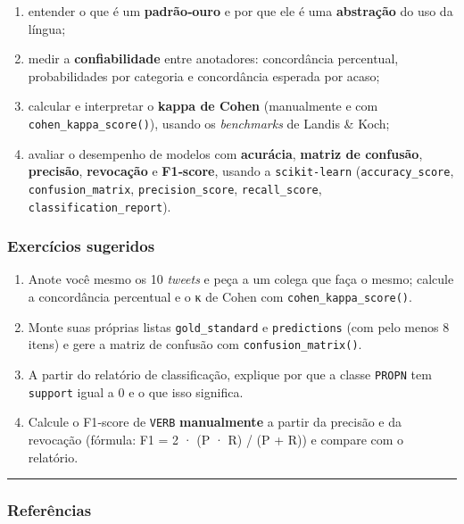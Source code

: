 \documentclass[
  brazilian,
  11pt,
]{article}
\providecommand{\tightlist}{%
  \setlength{\itemsep}{0pt}\setlength{\parskip}{0pt}}
\let\oldtexttt\texttt
\renewcommand{\texttt}[1]{{\color{inlink}\oldtexttt{#1}}}
\begin{document}
\begin{enumerate}
\def\labelenumi{\arabic{enumi}.}
\tightlist
\item
  entender o que é um \textbf{padrão‑ouro} e por que ele é uma
  \textbf{abstração} do uso da língua;
\item
  medir a \textbf{confiabilidade} entre anotadores: concordância
  percentual, probabilidades por categoria e concordância esperada por
  acaso;
\item
  calcular e interpretar o \textbf{kappa de Cohen} (manualmente e com
  \texttt{cohen\_kappa\_score()}), usando os \emph{benchmarks} de Landis
  \& Koch;
\item
  avaliar o desempenho de modelos com \textbf{acurácia}, \textbf{matriz
  de confusão}, \textbf{precisão}, \textbf{revocação} e
  \textbf{F1‑score}, usando a \texttt{scikit‑learn}
  (\texttt{accuracy\_score}, \texttt{confusion\_matrix},
  \texttt{precision\_score}, \texttt{recall\_score},
  \texttt{classification\_report}).
\end{enumerate}

\subsubsection{Exercícios sugeridos}\label{exercuxedcios-sugeridos}

\begin{enumerate}
\def\labelenumi{\arabic{enumi}.}
\tightlist
\item
  Anote você mesmo os 10 \emph{tweets} e peça a um colega que faça o
  mesmo; calcule a concordância percentual e o κ de Cohen com
  \texttt{cohen\_kappa\_score()}.
\item
  Monte suas próprias listas \texttt{gold\_standard} e
  \texttt{predictions} (com pelo menos 8 itens) e gere a matriz de
  confusão com \texttt{confusion\_matrix()}.
\item
  A partir do relatório de classificação, explique por que a classe
  \texttt{PROPN} tem \texttt{support} igual a 0 e o que isso significa.
\item
  Calcule o F1‑score de \texttt{VERB} \textbf{manualmente} a partir da
  precisão e da revocação (fórmula: F1 = 2 · (P · R) / (P + R)) e
  compare com o relatório.
\end{enumerate}

\begin{center}\rule{0.5\linewidth}{0.5pt}\end{center}

\subsubsection{Referências}\label{referuxeancias}
\end{document}
